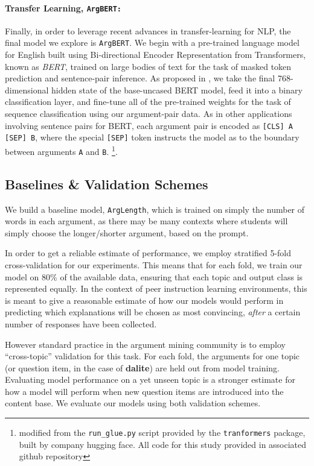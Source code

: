 \documentclass[runningheads]{llncs}
\begin{document}
\paragraph{\textbf{Transfer Learning, \tt{ArgBERT}:}}
Finally, in order to leverage recent advances in transfer-learning for NLP, the 
final model we explore is \verb|ArgBERT|.
We begin with a pre-trained language model for English built using  
Bi-directional Encoder Representation from Transformers, known as 
\textit{BERT}\cite{devlin_bert_2018}, trained on large bodies of text for the 
task of masked token prediction and sentence-pair inference. 
As proposed in \cite{toledo_automatic_2019}, we take the final 768-dimensional 
hidden state of the base-uncased BERT model, feed it into a binary 
classification layer, and fine-tune all of the pre-trained weights for the task 
of sequence classification using our argument-pair data. 
As in other applications involving sentence pairs for BERT, each argument pair 
is encoded as \verb|[CLS] A [SEP] B|, where the special \verb|[SEP]| token 
instructs the model as to the boundary between arguments \verb|A| and \verb|B|. 
\footnote{modified from the \verb|run_glue.py| 
script provided by the \verb|tranformers| package, built by company hugging 
face. All code for this study provided in associated github repository}.

\subsection{Baselines \& Validation Schemes}

We build a baseline model, \verb|ArgLength|, which is trained 
on simply the number of words in each argument, as there may be many contexts 
where students will simply choose the longer/shorter argument, based on the 
prompt. 

In order to get a reliable estimate of performance, we employ stratified 5-fold 
cross-validation for our experiments.
This means that for each fold, we train our model on 80\% of the available 
data, ensuring that each topic and output class is represented equally. 
In the context of peer instruction learning environments, this is meant to give 
a reasonable estimate of how our models would perform in predicting which 
explanations will be chosen as most convincing, \textit{after} a certain number 
of responses have been collected.
 
However standard practice in the argument mining community is to employ 
``cross-topic'' validation for this task. 
For each fold, the arguments for one topic (or question item, in the case of 
\textbf{dalite}) are held out from model training.
Evaluating model performance on a yet unseen topic is a stronger estimate for 
how a model will perform when new question items are introduced into the 
content base.
We evaluate our models using both validation schemes.
\end{document}
